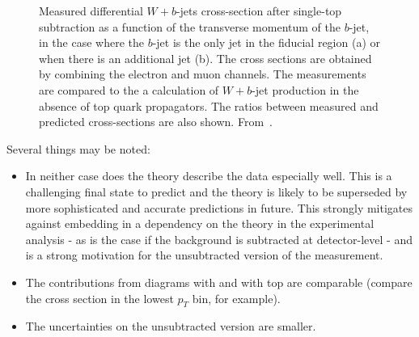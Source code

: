 \documentclass[floatfix]{article}
\begin{document}
\begin{figure}%
\centering
{}
\caption{\label{fig:notop}
Measured differential $W+b$-jets cross-section after single-top subtraction as a function of the transverse momentum of the $b$-jet, in the case where the $b$-jet is the only jet in the fiducial region (a) or when there is an additional jet (b). The cross sections are obtained by combining the electron and muon channels. The measurements are compared to the a calculation of $W+b$-jet production in the absence of top quark propagators.
The ratios between measured and predicted cross-sections are also shown. From~\protect\cite{Aad:2013vka}.}
\end{figure}

Several things may be noted:
\begin{itemize}
\item In neither case does the theory describe the data especially well. This is a challenging
final state to predict and the theory is likely to be superseded by more sophisticated and 
accurate predictions in future. This strongly mitigates against embedding in a dependency 
on the theory in the experimental analysis - as is the case if the background is subtracted at detector-level - 
and is a strong motivation for the unsubtracted version of the measurement.
\item The contributions from diagrams with and with top are comparable (compare the cross section in the lowest $p_T$ bin, 
for example).
\item The uncertainties on the unsubtracted version are smaller.
\end{itemize}
\end{document}

